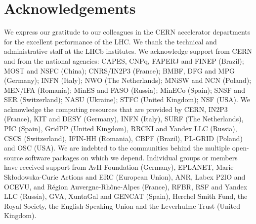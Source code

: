 \section*{Acknowledgements}
%
%
\noindent We express our gratitude to our colleagues in the CERN
accelerator departments for the excellent performance of the LHC. We
thank the technical and administrative staff at the LHCb
institutes. We acknowledge support from CERN and from the national
agencies: CAPES, CNPq, FAPERJ and FINEP (Brazil); MOST and NSFC
(China); CNRS/IN2P3 (France); BMBF, DFG and MPG (Germany); INFN
(Italy); NWO (The Netherlands); MNiSW and NCN (Poland); MEN/IFA
(Romania); MinES and FASO (Russia); MinECo (Spain); SNSF and SER
(Switzerland); NASU (Ukraine); STFC (United Kingdom); NSF (USA).  We
acknowledge the computing resources that are provided by CERN, IN2P3
(France), KIT and DESY (Germany), INFN (Italy), SURF (The
Netherlands), PIC (Spain), GridPP (United Kingdom), RRCKI and Yandex
LLC (Russia), CSCS (Switzerland), IFIN-HH (Romania), CBPF (Brazil),
PL-GRID (Poland) and OSC (USA). We are indebted to the communities
behind the multiple open-source software packages on which we depend.
Individual groups or members have received support from AvH Foundation
(Germany), EPLANET, Marie Sk\l{}odowska-Curie Actions and ERC
(European Union), ANR, Labex P2IO and OCEVU, and R\'{e}gion
Auvergne-Rh\^{o}ne-Alpes (France), RFBR, RSF and Yandex LLC (Russia),
GVA, XuntaGal and GENCAT (Spain), Herchel Smith Fund, the Royal
Society, the English-Speaking Union and the Leverhulme Trust (United
Kingdom).
